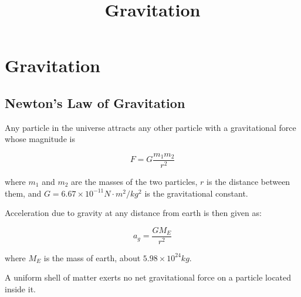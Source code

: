 \documentclass{article}
\title{Gravitation}
\begin{document}
\section{Gravitation}

\subsection{Newton's Law of Gravitation}

Any particle in the universe attracts any other particle with a gravitational force whose \@{magnitude} is

\[ F = G \frac{m_1 m_2}{r^2} \]

where $m_1$ and $m_2$ are the masses of the two particles, $r$ is the distance between them, and $G = 6.67 \times 10^{-11} N \cdot m^2/kg^2$ is the gravitational constant.

Acceleration due to gravity at any distance from earth is then given as:

\[ a_g = \frac{GM_E}{r^2} \]

where $M_E$ is the mass of earth, about $5.98 \times 10^{24} kg.$

A uniform shell of matter exerts no net gravitational force on a particle located inside it.
\end{document}
